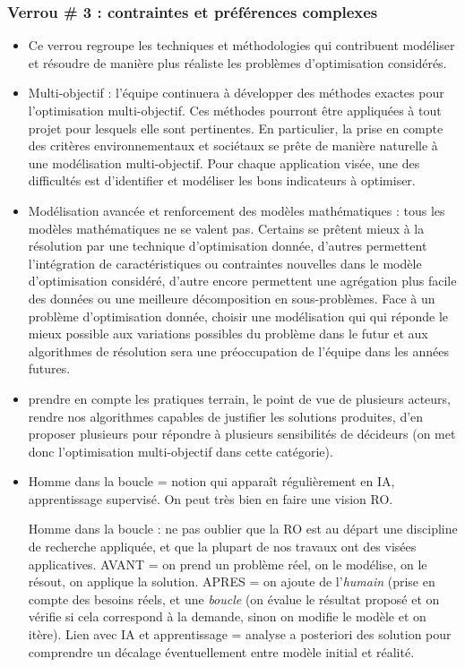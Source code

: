 	\subsubsection*{Verrou \# 3 : contraintes et préférences complexes}
	
	\begin{itemize}
		\item Ce verrou regroupe les techniques et méthodologies qui contribuent modéliser et résoudre de manière plus réaliste les problèmes d'optimisation considérés. 
		
		\item Multi-objectif : l'équipe continuera à développer des méthodes exactes pour l'optimisation multi-objectif. Ces méthodes pourront être appliquées à tout projet pour lesquels elle sont pertinentes. En particulier, la prise en compte des critères environnementaux et sociétaux se prête de manière naturelle à une modélisation multi-objectif. Pour chaque application visée, une des difficultés est d'identifier et modéliser les bons indicateurs à optimiser.  
	
		\item Modélisation avancée et renforcement des modèles mathématiques : tous les modèles mathématiques ne se valent pas. Certains se prêtent mieux à la résolution par une technique d'optimisation donnée, d'autres permettent l'intégration de caractéristiques ou contraintes nouvelles dans le modèle d'optimisation considéré, d'autre encore permettent une agrégation plus facile des données ou une meilleure décomposition en sous-problèmes. Face à un problème d'optimisation donnée, choisir une modélisation qui qui réponde le mieux possible aux variations possibles du problème dans le futur et aux algorithmes de résolution sera une préoccupation de l'équipe dans les années futures.  
		
		
		\item  prendre en compte les pratiques terrain, le point de vue de plusieurs acteurs, rendre nos algorithmes capables de justifier les solutions produites, d'en proposer plusieurs pour répondre à plusieurs sensibilités de décideurs (on met donc l'optimisation multi-objectif dans cette catégorie).
		

	\item 	Homme dans la boucle = notion qui apparaît régulièrement en IA, apprentissage supervisé. On peut très bien en faire une vision RO. 
	
	Homme dans la boucle : ne pas oublier que la RO est au départ une discipline de recherche appliquée, et que la plupart de nos travaux ont des visées applicatives. AVANT = on prend un problème réel, on le modélise, on le résout, on applique la solution. APRES = on ajoute de l'\textit{humain} (prise en compte des besoins réels, et une \textit{boucle} (on évalue le résultat proposé et on vérifie si cela correspond à la demande, sinon on modifie le modèle et on itère). Lien avec IA et apprentissage = analyse a posteriori des solution pour comprendre un décalage éventuellement entre modèle initial et réalité. 
	



\end{itemize}
